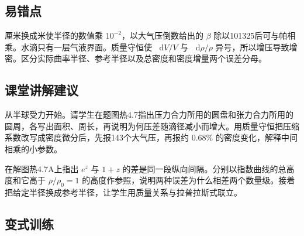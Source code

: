 \documentclass[UTF8,fontset=fandol,a4paper,11pt]{ctexart}
\newcommand{\dd}{\mathop{}\!\mathrm{d}}
\begin{document}


\subsection*{易错点}

厘米换成米使半径的数值乘 $10^{-2}$，以大气压倒数给出的 $\beta$ 除以101325后可与帕相乘。水滴只有一层气液界面。质量守恒使 $\dd V/V$ 与 $\dd\rho/\rho$ 异号，所以增压导致增密。区分实际曲率半径、参考半径以及总密度和密度增量两个误差分母。



\subsection*{课堂讲解建议}

从半球受力开始。请学生在题图热4.7指出压力合力所用的圆盘和张力合力所用的圆周，各写出面积、周长，再说明为何压差随滴径减小而增大。用质量守恒把压缩系数改写成密度微分后，先报143个大气压，再报约 $0.68\%$ 的密度变化，解释中间相乘的小参数。

在解图热4.7A上指出 $e^z$ 与 $1+z$ 的差是同一段纵向间隔。分别以指数曲线的总高度和它高于 $\rho/\rho_0=1$ 的高度作参照，说明两种误差为什么相差两个数量级。接着把给定半径换成参考半径，让学生用质量关系与拉普拉斯式联立。



\subsection*{变式训练}
\end{document}
